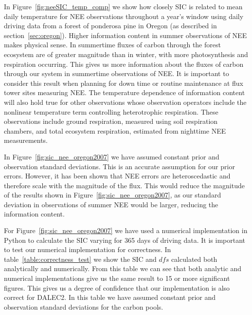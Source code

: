 \documentclass[11pt]{article}
\begin{document}
In Figure~\ref{fig:neeSIC_temp_comp} we show how closely SIC is related to mean daily temperature for NEE observations throughout a year's window using daily driving data from a forest of ponderosa pine in Oregon (as described in section~\ref{sec:oregon}). Higher information content in summer observations of NEE makes physical sense. In summertime fluxes of carbon through the forest ecosystem are of greater magnitude than in winter, with more photosynthesis and respiration occurring. This gives us more information about the fluxes of carbon through our system in summertime observations of NEE. It is important to consider this result when planning for down time or routine maintenance at flux tower sites measuring NEE. The temperature dependence of information content will also hold true for other observations whose observation operators include the nonlinear temperature term controlling heterotrophic respiration. These observations include ground respiration, measured using soil respiration chambers, and total ecosystem respiration, estimated from nighttime NEE measurements.

In Figure~\ref{fig:sic_nee_oregon2007} we have assumed constant prior and observation standard deviations. This is an accurate assumption for our prior errors. However, it has been shown that NEE errors are heteroscedastic \citep{Richardson200838} and therefore scale with the magnitude of the flux. This would reduce the magnitude of the results shown in Figure~\ref{fig:sic_nee_oregon2007}, as our standard deviation in observations of summer NEE would be larger, reducing the information content.

For Figure~\ref{fig:sic_nee_oregon2007} we have used a numerical implementation in Python to calculate the SIC varying for 365 days of driving data. It is important to test our numerical implementation for correctness. In table~\ref{table:correctness_test} we show the SIC and \(dfs\) calculated both analytically and numerically. From this table we can see that both analytic and numerical implementations give us the same result to 15 or more significant figures. This gives us a degree of confidence that our implementation is also correct for DALEC2. In this table we have assumed constant prior and observation standard deviations for the carbon pools.
\end{document}

